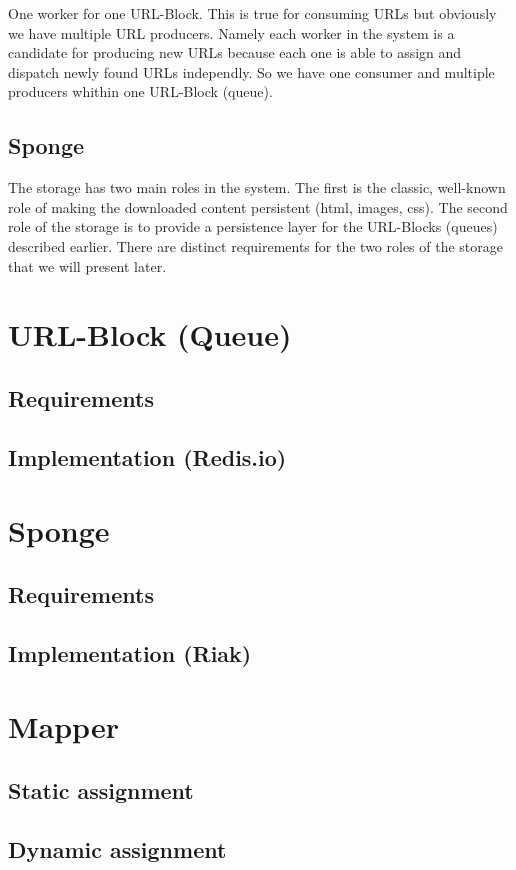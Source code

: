 One worker for one URL-Block. This is true for consuming URLs but obviously we have multiple URL producers. Namely each worker in the system is a candidate for producing new URLs because each one is able to assign and dispatch newly found URLs independly. So we have one consumer and multiple producers whithin one URL-Block (queue).

\subsection{Sponge}
The storage has two main roles in the system. The first is the classic, well-known role of making the downloaded content persistent (html, images, css). The second role of the storage is to provide a persistence layer for the URL-Blocks (queues) described earlier.
There are distinct requirements for the two roles of the storage that we will present later.

\section{URL-Block (Queue)}
\subsection{Requirements}
\subsection{Implementation (Redis.io)}

\section{Sponge}
\subsection{Requirements}
\subsection{Implementation (Riak)}

\section{Mapper}
\subsection{Static assignment}
\subsection{Dynamic assignment}
